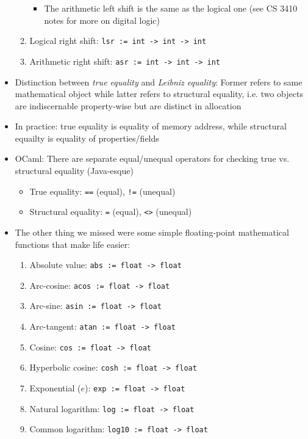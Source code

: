 \begin{itemize}
\begin{enumerate}
\begin{itemize}
            \item The arithmetic left shift is the same as the logical one (see CS 3410 notes for more on digital logic)
        \end{itemize}
        \item Logical right shift: \texttt{lsr := int -> int -> int}
        \item Arithmetic right shift: \texttt{asr := int -> int -> int}
    \end{enumerate}
    \item Distinction between \textit{true equality} and \textit{Leibniz equality}: Former refers to same mathematical object while latter refers to structural equality, i.e. two objects are indiscernable property-wise but are distinct in allocation
    \item In practice: true equality is equality of memory address, while structural equailty is equality of properties/fields
    \item \textsf{OCaml}: There are separate equal/unequal operators for checking true vs. structural equality (\textsf{Java}-esque)
    \begin{itemize}
        \item True equality: \texttt{==} (equal), \texttt{!=} (unequal)
        \item Structural equality: \texttt{=} (equal), \texttt{<>} (unequal)
    \end{itemize}
    \item The other thing we missed were some simple floating-point mathematical functions that make life easier:
    \begin{enumerate}
        \item Absolute value: \texttt{abs := float -> float}
        \item Arc-cosine: \texttt{acos := float -> float}
        \item Arc-sine: \texttt{asin := float -> float}
        \item Arc-tangent: \texttt{atan := float -> float}
        \item Cosine: \texttt{cos := float -> float}
        \item Hyperbolic cosine: \texttt{cosh := float -> float}
        \item Exponential ($e$): \texttt{exp := float -> float}
        \item Natural logarithm: \texttt{log := float -> float}
        \item Common logarithm: \texttt{log10 := float -> float}

\end{enumerate}
\end{itemize}
